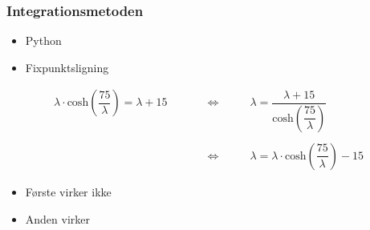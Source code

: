 \begin{frame}
\frametitle{Integrationsmetoden}
\center
%
\begin{itemize}
\item Python
\item Fixpunktsligning
\end{itemize}
%
\begin{align*}
\lambda \cdot \text{cosh}(\dfrac{75}{\lambda})=\lambda+15 
\phantom{HHH} & \Leftrightarrow \phantom{HHH}
\lambda=\dfrac{\lambda+15}{\text{cosh}(\dfrac{75}{\lambda})} \\
\\
 \phantom{HHH} & \Leftrightarrow \phantom{HHH}
\lambda = \lambda \cdot \text{cosh}(\dfrac{75}{\lambda})-15  
\end{align*}
\begin{itemize}
\item Første virker ikke 
\item Anden virker 
\end{itemize}
\end{frame}